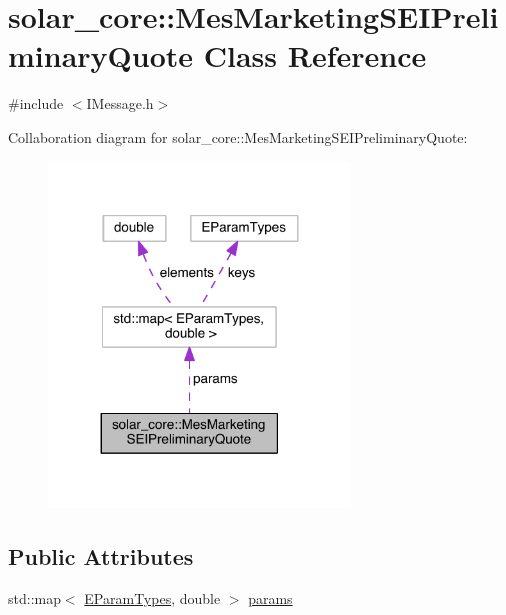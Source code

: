 \hypertarget{classsolar__core_1_1_mes_marketing_s_e_i_preliminary_quote}{}\section{solar\+\_\+core\+:\+:Mes\+Marketing\+S\+E\+I\+Preliminary\+Quote Class Reference}
\label{classsolar__core_1_1_mes_marketing_s_e_i_preliminary_quote}


{\ttfamily \#include $<$I\+Message.\+h$>$}



Collaboration diagram for solar\+\_\+core\+:\+:Mes\+Marketing\+S\+E\+I\+Preliminary\+Quote\+:\nopagebreak
\begin{figure}[H]
\begin{center}
\leavevmode
\includegraphics[width=227pt]{classsolar__core_1_1_mes_marketing_s_e_i_preliminary_quote__coll__graph}
\end{center}
\end{figure}
\subsection*{Public Attributes}
\begin{DoxyCompactItemize}
\item 
std\+::map$<$ \hyperlink{namespacesolar__core_aa1147341e5ef7a40d68d1bd68e149362}{E\+Param\+Types}, double $>$ \hyperlink{classsolar__core_1_1_mes_marketing_s_e_i_preliminary_quote_abe529e6fd227f28d2aab0c6df56e998d}{params}
\end{DoxyCompactItemize}


